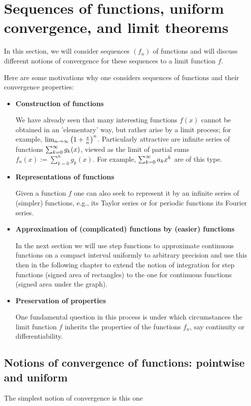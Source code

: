 \documentclass[10pt, a4paper]{article}
\begin{document}
\section{Sequences of functions, uniform convergence, and limit theorems}

In this section,
we will consider sequences $(f_n)$ of functions and will discuss different notions of convergence for these sequences to a limit function $f$.

Here are some motivations why one considers sequences of functions and their convergence properties:
\begin{itemize}
    \item \textbf{Construction of functions}

    We have already seen that many interesting functions $f(x)$ cannot be obtained in an 'elementary' way,
    but rather arise by a limit process;
    for example,
    $\lim_{n \rightarrow \infty}\left(1 + \frac{x}{n}\right) ^ n$.
    Particularly attractive are infinite series of functions $\sum_{k = 0}^{\infty} g_k(x)$,
    viewed as the limit of partial sums $f_n(x) := \sum_{k = 0}^{n}g_k(x)$.
    For example,
    $\sum_{k = 0}^{\infty} a_kx ^ k$ are of this type.

    \item \textbf{Representations of functions}

    Given a function $f$ one can also seek to represent it by an infinite series of
    (simpler)
    functions,
    e.g.,
    its Taylor series or for periodic functions its Fourier series.

    \item \textbf{Approximation of (complicated) functions by (easier) functions}

    In the next section we will use step functions to approximate continuous functions on a compact interval uniformly to arbitrary precision and use this then in the following chapter to extend the notion of integration for step functions
    (signed area of rectangles)
    to the one for continuous functions
    (signed area under the graph).

    \item \textbf{Preservation of properties}

    One fundamental question in this process is under which circumstances the limit function $f$ inherits the properties of the functions $f_n$,
    say continuity or differentiability.
\end{itemize}

\subsection{Notions of convergence of functions: pointwise and uniform}
The simplest notion of convergence is this one
\end{document}
